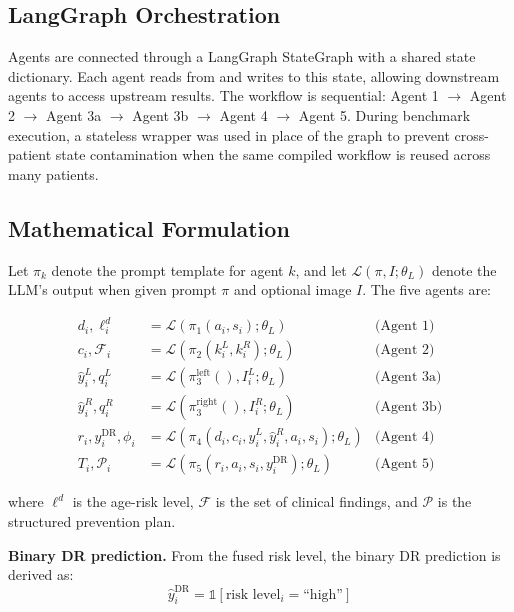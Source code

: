 \documentclass[11pt,a4paper]{article}
\begin{document}
\subsection{LangGraph Orchestration}

Agents are connected through a LangGraph StateGraph with a shared state dictionary. Each agent reads from and writes to this state, allowing downstream agents to access upstream results. The workflow is sequential: Agent 1 $\rightarrow$ Agent 2 $\rightarrow$ Agent 3a $\rightarrow$ Agent 3b $\rightarrow$ Agent 4 $\rightarrow$ Agent 5. During benchmark execution, a stateless wrapper was used in place of the graph to prevent cross-patient state contamination when the same compiled workflow is reused across many patients.

\subsection{Mathematical Formulation}

Let $\pi_k$ denote the prompt template for agent $k$, and let $\mathcal{L}(\pi, I; \theta_L)$ denote the LLM's output when given prompt $\pi$ and optional image $I$. The five agents are:

\begin{equation}
\begin{aligned}
d_i, \ell^d_i &= \mathcal{L}(\pi_1(a_i, s_i); \theta_L) & \text{(Agent 1)} \\
c_i, \mathcal{F}_i &= \mathcal{L}(\pi_2(k_i^L, k_i^R); \theta_L) & \text{(Agent 2)} \\
\hat{y}_i^{L}, q_i^{L} &= \mathcal{L}(\pi_3^{\text{left}}(), I_i^L; \theta_L) & \text{(Agent 3a)} \\
\hat{y}_i^{R}, q_i^{R} &= \mathcal{L}(\pi_3^{\text{right}}(), I_i^R; \theta_L) & \text{(Agent 3b)} \\
r_i, y_i^{\text{DR}}, \phi_i &= \mathcal{L}(\pi_4(d_i, c_i, \hat{y}_i^L, \hat{y}_i^R, a_i, s_i); \theta_L) & \text{(Agent 4)} \\
T_i, \mathcal{P}_i &= \mathcal{L}(\pi_5(r_i, a_i, s_i, y_i^{\text{DR}}); \theta_L) & \text{(Agent 5)}
\end{aligned}
\end{equation}

where $\ell^d$ is the age-risk level, $\mathcal{F}$ is the set of clinical findings, and $\mathcal{P}$ is the structured prevention plan.

\textbf{Binary DR prediction.} From the fused risk level, the binary DR prediction is derived as:
\begin{equation}
\hat{y}_i^{\text{DR}} = \mathbb{1}[\text{risk level}_i = \text{``high''}]
\end{equation}
\end{document}
